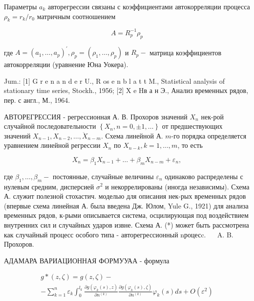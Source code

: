\documentclass[10pt]{article}
\begin{document}
Параметры $a_{k}$ авторегрессии связаны с коэффициентами автокорреляции процесса $\rho_{k}=r_{k} / r_{0}$ матричным соотношением



\[

A=R_{p}^{-1} \rho_{p}

\]



где $A=\left(a_{1}, \ldots, a_{p}\right)^{\prime}, \rho_{p}=\left(\rho_{1}, \ldots, \rho_{p}\right)$ и $R_{p}-$ матрица коэффициентов автокорреляции (уравнение Юна Уокера).



Jum.: [1] G r e n a n d e r U., R os e n b l a t t M., Statistical analysis of stationary time series, Stockh., 1956; [2] X e Hв а н Э., Анализ временных рядов, пер. с англ., М., 1964.



АВТОРЕГРЕССИЯ - регрессионная А. В. Прохоров значений $X_{n}$ нек-рой случайной последовательности $\left\{X_{n}, n=0, \pm 1, \ldots\right\}$ от предшествующих значений $X_{n-1}, X_{n-2}, \ldots, \ddot{X}_{n-m}$. Схема линейной А. $m$-го порядка определяется уравнением линейной регрессии $X_{n}$ по $X_{n-k}, k=1, \ldots, m$, то есть



\[

X_{n}=\beta_{1} X_{n-1}+\ldots+\beta_{m} X_{n-m}+\varepsilon_{n},

\]



где $\beta_{1}, \ldots, \beta_{m}-$ постоянные, случайные величины $\varepsilon_{n}$ одинаково распределены с нулевым средним, дисперсией $\sigma^{2}$ и некоррелированы (иногда независимы). Схема А. служит полезной стохастич. моделью для описания нек-рых временных рядов (впервые схема линейная А. была введена Дж. Юлом, Yule G., 1921) для анализа временных рядов, к-рыми описывается система, осцилирующая под воздействием внутренних сил и случайных ударов извне. Схема А. (*) может быть рассмотрена как случайный процесс особого типа - авторегрессионный nроцесc. $\quad$ A. B. Прохоров.



АДАМАРА ВАРИАЦИОННАЯ ФОРМУУАА - формула



\[

\begin{gathered}

g *(z, \zeta)=g(z, \zeta)- \\

-\sum_{k=1}^{n} \varepsilon_{k} \int_{0}^{l_{k}} \frac{\partial g\left(\varphi_{k}(s), z\right)}{\partial n^{(k)}} \frac{\partial g\left(\varphi_{k}(s), \zeta\right)}{\partial n^{(k)}} \varphi_{k}(s) d s+O\left(\varepsilon^{2}\right)

\end{gathered}

\]
\end{document}
